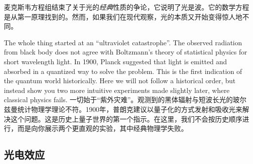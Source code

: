 
麦克斯韦方程组结束了关于光的\emph{经典}性质的争论，它说明了光是波。它的数学方程是从第一原理找到的。然而，如果我们在现代观察，光的本质又开始变得惊人地不同。

The whole thing started at an ``ultraviolet catastrophe''. The observed radiation from black body does not agree with Boltzmann's theory of statistical physics for short wavelength light. In 1900, Planck suggested that light is emitted and absorbed in a quantized way to solve the problem. This is the first indication of the quantum world historically. Here we will not follow a historical order, but instead show you two more intuitive experiments made slightly later, where classical physics fails.
一切始于“紫外灾难”。观测到的黑体辐射与短波长光的玻尔兹曼统计物理学理论不符。1900年，普朗克建议以量子化的方式发射和吸收光来解决这个问题。这是历史上量子世界的第一个指示。在这里，我们不会按历史顺序进行，而是向你展示两个更直观的实验，其中经典物理学失败。

\subsection{光电效应}

